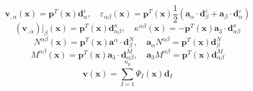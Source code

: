 \begin{equation}
    \boldsymbol v_{,\alpha}(\boldsymbol x) = \boldsymbol p^T(\boldsymbol x) \boldsymbol d_{\alpha}^\varepsilon, \quad
    \varepsilon_{\alpha\beta}(\boldsymbol x) = \boldsymbol p^T(\boldsymbol x) \frac{1}{2}(\boldsymbol a_\alpha \cdot \boldsymbol d_{\beta}^\varepsilon + \boldsymbol a_\beta \cdot \boldsymbol d_{\alpha}^\varepsilon)
\end{equation}
\begin{equation}
    (\boldsymbol v_{,\alpha})\vert_\beta(\boldsymbol x) = \boldsymbol p^T(\boldsymbol x) \boldsymbol d_{\alpha\beta}^\kappa , \quad
    \kappa^{\alpha\beta}(\boldsymbol x) = - \boldsymbol p^T(\boldsymbol x) \boldsymbol a_3 \cdot \boldsymbol d_{\alpha\beta}^\kappa
\end{equation}
\begin{equation}
N^{\alpha\beta}(\boldsymbol x) = \boldsymbol p^T(\boldsymbol x) \boldsymbol a^\alpha \cdot \boldsymbol d_{\beta}^N,\quad
\boldsymbol a_\alpha N^{\alpha\beta} = \boldsymbol p^T(\boldsymbol x) \boldsymbol d^N_\beta
\end{equation}
\begin{equation}
    M^{\alpha\beta}(\boldsymbol x) = \boldsymbol p^T(\boldsymbol x) \boldsymbol a_3 \cdot \boldsymbol d_{\alpha\beta}^M,\quad
    \boldsymbol a_3 M^{\alpha\beta} = \boldsymbol p^T(\boldsymbol x) \boldsymbol d_{\alpha\beta}^M
\end{equation}
\begin{equation}
\boldsymbol v(\boldsymbol x) = \sum_{I=1}^{n_p} \Psi_I(\boldsymbol x) \boldsymbol d_I
\end{equation}
